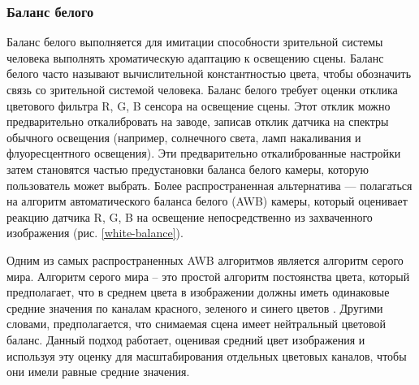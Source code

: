 \subsubsection{Баланс белого}

Баланс белого выполняется для имитации способности зрительной системы человека выполнять хроматическую адаптацию к освещению сцены. Баланс белого часто называют вычислительной константностью цвета, чтобы обозначить связь со зрительной системой человека. Баланс белого
требует оценки отклика цветового фильтра R, G, B сенсора на освещение сцены. Этот отклик можно предварительно откалибровать на заводе, записав отклик датчика на спектры обычного освещения (например, солнечного света, ламп накаливания и флуоресцентного освещения). Эти предварительно откалиброванные настройки затем становятся частью предустановки баланса белого камеры, которую пользователь может выбрать. Более распространенная альтернатива — полагаться на алгоритм автоматического баланса белого (AWB) камеры, который оценивает реакцию датчика R, G, B на освещение непосредственно из захваченного изображения (рис. \ref{white-balance}).



Одним из самых распространенных AWB алгоритмов является алгоритм серого мира. Алгоритм серого мира -- это простой алгоритм постоянства цвета, который предполагает, что в среднем цвета в изображении должны иметь одинаковые средние значения по каналам красного, зеленого и синего цветов \cite{lib-gray-world}. Другими словами, предполагается, что снимаемая сцена имеет нейтральный цветовой баланс. Данный подход работает, оценивая средний цвет изображения и используя эту оценку для масштабирования отдельных цветовых каналов, чтобы они имели равные средние значения.